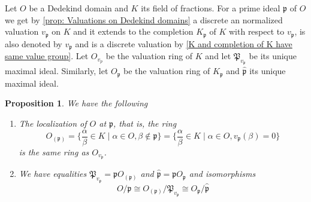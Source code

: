\documentclass{article}
\newtheorem{proposition}{Proposition}[section]
\newcommand{\mfrak}[1]{\mathfrak{#1}}
\newcommand{\vp}{{v_{\mfrak p}}}
\numberwithin{equation}{section}
\begin{document}
Let $O$ be a Dedekind domain and $K$ its field of fractions. For a prime ideal $\mfrak p$ of $O$ we get by \cref{prop: Valuations on Dedekind domains} a discrete an normalized valuation $\vp$ on $K$ and it extends to the completion $K_\mfrak{p}$ of $K$ with respect to $v_\mfrak{p}$, is also denoted by $v_\mfrak{p}$ and is a discrete valuation by \cref{K and completion of K have same value group}. Let $O_{v_p}$ be the valuation ring of $K$ and let $\mfrak{P}_{v_\mfrak{p}}$ be its unique maximal ideal. Similarly, let $O_\mfrak{p}$ be the valuation ring of $K_\mfrak{p}$ and $\hat{\mfrak{p}}$ its unique maximal ideal.

\begin{proposition} \label{prop: Valuations on Dedekind domains properties}
	We have the following
	\begin{enumerate}
    	\item The localization of $O$ at $\mfrak p$, that is, the ring
          	$$O_{(\mfrak p)} = \{\frac{\alpha}{\beta} \in K \mid \alpha \in O, \beta \notin \mfrak p\} =  \{\frac{\alpha}{\beta} \in K \mid \alpha \in O, \vp(\beta) = 0 \}$$
          	is the same ring as $O_{\vp}$.
    	\item We have equalities $\mfrak P_\vp = \mfrak p O_{(\mfrak p)}$ and $\hat {\mfrak p } = \mfrak p O_{\mfrak p}$ and isomorphisms
          	$$
              	O / \mfrak{p} \cong O_{(\mfrak{p})} / \mfrak{P}_{v_{\mfrak{p}}} \cong O_{\mfrak{p}} / \hat{\mfrak{p}}
          	$$

	\end{enumerate}

\end{proposition}
\end{document}
